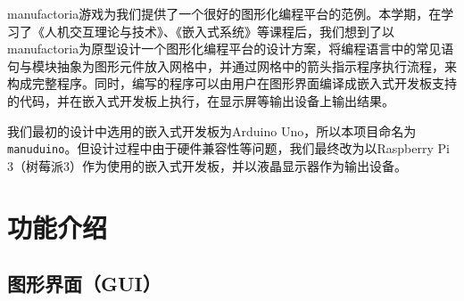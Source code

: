 \documentclass[UTF8]{ctexart}
\begin{document}
manufactoria游戏为我们提供了一个很好的图形化编程平台的范例。本学期，在学习了《人机交互理论与技术》、《嵌入式系统》等课程后，我们想到了以manufactoria为原型设计一个图形化编程平台的设计方案，将编程语言中的常见语句与模块抽象为图形元件放入网格中，并通过网格中的箭头指示程序执行流程，来构成完整程序。同时，编写的程序可以由用户在图形界面编译成嵌入式开发板支持的代码，并在嵌入式开发板上执行，在显示屏等输出设备上输出结果。\par
我们最初的设计中选用的嵌入式开发板为Arduino Uno，所以本项目命名为\texttt{manuduino}。但设计过程中由于硬件兼容性等问题，我们最终改为以Raspberry Pi 3（树莓派3）作为使用的嵌入式开发板，并以液晶显示器作为输出设备。\par

\section{功能介绍}
\subsection{图形界面（GUI）}
\end{document}
